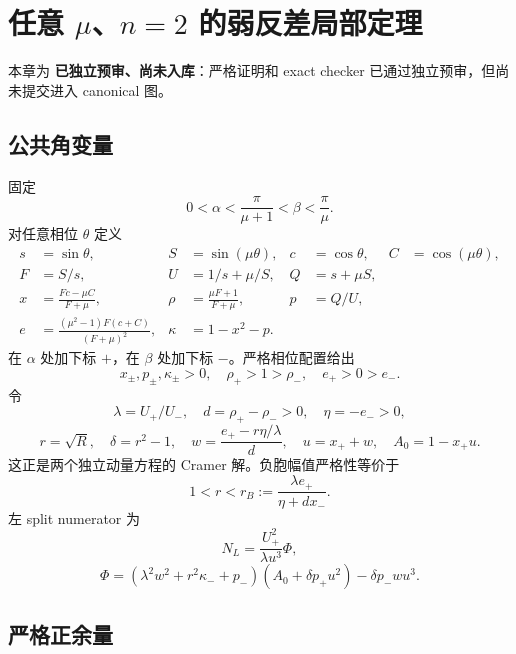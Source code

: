 \documentclass[UTF8,12pt,openany,fontset=fandol]{ctexrep}
\theoremstyle{definition}
\newcommand{\Reviewed}{\textcolor{blue!65!black}{\textbf{已独立预审、尚未入库}}}
\begin{document}
\chapter{任意 $\mu$、$n=2$ 的弱反差局部定理}

本章为 \Reviewed：严格证明和 exact checker 已通过独立预审，但尚未提交进入 canonical 图。

\section{公共角变量}

固定
\begin{equation}
 0<\alpha<\frac\pi{\mu+1}<\beta<\frac\pi\mu.
\end{equation}
对任意相位 $\theta$ 定义
\begin{align*}
 s&=\sin\theta,&S&=\sin(\mu\theta),&c&=\cos\theta,&C&=\cos(\mu\theta),\\
 F&=S/s,&U&=1/s+\mu/S,&Q&=s+\mu S,\\
 x&=\frac{Fc-\mu C}{F+\mu},&
 \rho&=\frac{\mu F+1}{F+\mu},&p&=Q/U,\\
 e&=\frac{(\mu^2-1)F(c+C)}{(F+\mu)^2},&
 \kappa&=1-x^2-p.
\end{align*}
在 $\alpha$ 处加下标 $+$，在 $\beta$ 处加下标 $-$。严格相位配置给出
\begin{equation}
 x_\pm,p_\pm,\kappa_\pm>0,\quad \rho_+>1>\rho_-,\quad e_+>0>e_-.
\end{equation}
令
\begin{equation}
 \lambda=U_+/U_-,\quad d=\rho_+-\rho_->0,\quad \eta=-e_->0,
\end{equation}
\begin{equation}
 r=\sqrt R,\quad \delta=r^2-1,\quad
 w=\frac{e_+-r\eta/\lambda}{d},\quad u=x_++w,\quad A_0=1-x_+u.
\end{equation}
这正是两个独立动量方程的 Cramer 解。负胞幅值严格性等价于
\begin{equation}
 1<r<r_B:=\frac{\lambda e_+}{\eta+dx_-}.
\end{equation}
左 split numerator 为
\begin{equation}
 N_L=\frac{U_+^2}{\lambda u^3}\Phi,
\end{equation}
\begin{equation}\label{eq:Phi}
 \Phi=(\lambda^2w^2+r^2\kappa_-+p_-)
 (A_0+\delta p_+u^2)-\delta p_-wu^3.
\end{equation}

\section{严格正余量}
\end{document}
